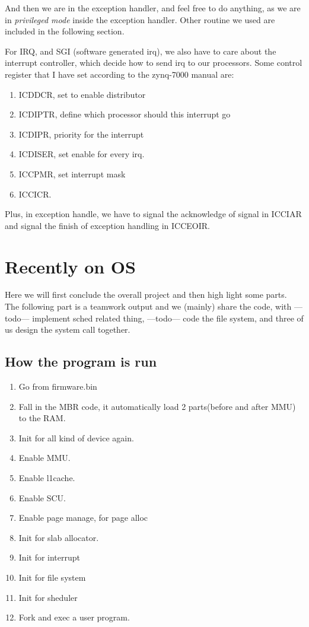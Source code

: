 \documentclass{article}
\begin{document}
And then we are in the exception handler, and feel free to do anything, as we are in \emph{privileged mode} inside the exception handler. Other routine we used are included in the following section.

For IRQ, and SGI (software generated irq), we also have to care about the interrupt controller, which decide how to send irq to our processors. Some control register that I have set according to the zynq-7000 manual are:
\begin{enumerate}
	\item	ICDDCR, set to enable distributor
	\item	ICDIPTR, define which processor should this interrupt go
	\item	ICDIPR, priority for the interrupt
	\item	ICDISER, set enable for every irq.
	\item	ICCPMR, set interrupt mask
	\item	ICCICR.
\end{enumerate}

Plus, in exception handle, we have to signal the acknowledge of signal in ICCIAR and signal the finish of exception handling in ICCEOIR.

\section{Recently on OS}

Here we will first conclude the overall project and then high light some parts. The following part is a teamwork output and we (mainly) share the code, with ---todo--- implement sched related thing, ---todo--- code the file system, and three of us design the system call together. 

\subsection{How the program is run}
\begin{enumerate}
	\item	Go from firmware.bin
	\item	Fall in the MBR code, it automatically load 2 parts(before and after MMU) to the RAM.
	\item Init for all kind of device again.
	\item Enable MMU.
	\item	Enable l1cache.
	\item	Enable SCU.
	\item	Enable page manage, for page alloc
	\item	Init for slab allocator.
	\item	Init for interrupt
	\item	Init for file system
	\item Init for sheduler
	\item	Fork and exec a user program.
\end{enumerate}
\end{document}
